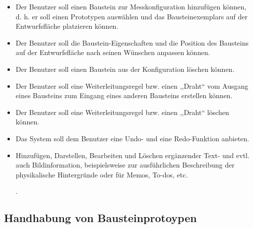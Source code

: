 \documentclass[parskip=full]{scrartcl}
\begin{document}
\begin{itemize}
	
	\item 
	\begin{MussKrit} 			
		Der Benutzer soll einen Baustein zur Messkonfiguration hinzufügen können, d. h. er soll einen Prototypen auswählen und das Bausteinexemplars auf der Entwurfsfläche platzieren können. 
	\end{MussKrit}
	
	\item 
	\begin{MussKrit} 		
		Der Benutzer soll die Baustein-Eigenschaften und die Position des Bausteins auf der Entwurfsfläche nach seinen Wünschen anpassen können.
	\end{MussKrit}
	
	\item 
	\begin{MussKrit} 			
		Der Benutzer soll einen Baustein aus der Konfiguration löschen können.
	\end{MussKrit}
	
	\item 
	\begin{MussKrit} 			
		Der Benutzer soll eine Weiterleitungsregel bzw. einen ,,Draht`` vom Ausgang eines Bausteins zum Eingang eines anderen Bausteins erstellen können.
	\end{MussKrit}
	
	\item 
	\begin{MussKrit} 			
		Der Benutzer soll eine Weiterleitungsregel bzw. einen ,,Draht`` löschen können.
	\end{MussKrit}
	
	\item 
	\begin{SollKrit} 			
		Das System soll dem Benutzer eine Undo- und eine Redo-Funktion anbieten.
	\end{SollKrit}
			
	\item 
	\begin{WunschKrit} 
		Hinzufügen, Darstellen, Bearbeiten und Löschen ergänzender Text- und evtl. auch Bildinformation, beispielsweise zur ausführlichen Beschreibung der physikalische Hintergründe oder für Memos, To-dos, etc.
	\end{WunschKrit}.
	
\end{itemize}

\subsection{Handhabung von Bausteinprotoypen}
\end{document}
